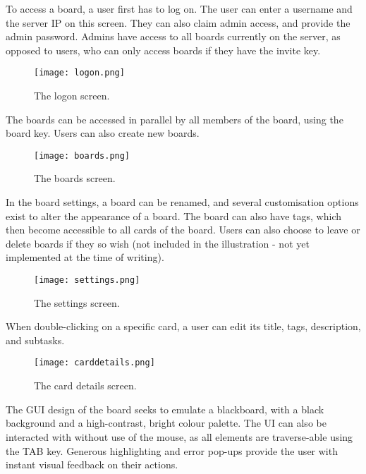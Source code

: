 To access a board, a user first has to log on. The user can enter a username and the server IP on this screen. They can also claim admin access, and provide the admin password. Admins have access to all boards currently on the server, as opposed to users, who can only access boards if they have the invite key.

\begin{figure}[h]
    \texttt{[image: logon.png]}
    \caption{The logon screen.}
\end{figure}
 
 The boards can be accessed in parallel by all members of the board, using the board key. Users can also create new boards.

\begin{figure}[h]
    \texttt{[image: boards.png]}
    \caption{The boards screen.}
\end{figure}

In the board settings, a board can be renamed, and several customisation options exist to alter the appearance of a board. The board can also have tags, which then become accessible to all cards of the board. Users can also choose to leave or delete boards if they so wish (not included in the illustration - not yet implemented at the time of writing).

\begin{figure}[h]
    \texttt{[image: settings.png]}
    \caption{The settings screen.}
\end{figure}

When double-clicking on a specific card, a user can edit its title, tags, description, and subtasks.

\begin{figure}[h]
    \texttt{[image: carddetails.png]}
    \caption{The card details screen.}
\end{figure}

The GUI design of the board seeks to emulate a blackboard, with a black background and a high-contrast, bright colour palette. The UI can also be interacted with without use of the mouse, as all elements are traverse-able using the TAB key. Generous highlighting and error pop-ups provide the user with instant visual feedback on their actions. 
